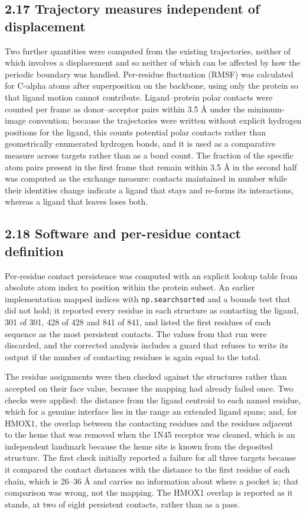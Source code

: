 \documentclass[utf8]{FrontiersinVancouver}
\begin{document}
\subsection{2.17 Trajectory measures independent of displacement}

Two further quantities were computed from the existing trajectories, neither of which involves a displacement and so neither of which can be affected by how the periodic boundary was handled. Per-residue fluctuation (RMSF) was calculated for C-alpha atoms after superposition on the backbone, using only the protein so that ligand motion cannot contribute. Ligand--protein polar contacts were counted per frame as donor--acceptor pairs within 3.5 \AA{} under the minimum-image convention; because the trajectories were written without explicit hydrogen positions for the ligand, this counts potential polar contacts rather than geometrically enumerated hydrogen bonds, and it is used as a comparative measure across targets rather than as a bond count. The fraction of the specific atom pairs present in the first frame that remain within 3.5 \AA{} in the second half was computed as the exchange measure: contacts maintained in number while their identities change indicate a ligand that stays and re-forms its interactions, whereas a ligand that leaves loses both.

\subsection{2.18 Software and per-residue contact definition}

Per-residue contact persistence was computed with an explicit lookup table from absolute atom index to position within the protein subset. An earlier implementation mapped indices with \texttt{np.searchsorted} and a bounds test that did not hold; it reported every residue in each structure as contacting the ligand, 301 of 301, 428 of 428 and 841 of 841, and listed the first residues of each sequence as the most persistent contacts. The values from that run were discarded, and the corrected analysis includes a guard that refuses to write its output if the number of contacting residues is again equal to the total.

The residue assignments were then checked against the structures rather than accepted on their face value, because the mapping had already failed once. Two checks were applied: the distance from the ligand centroid to each named residue, which for a genuine interface lies in the range an extended ligand spans; and, for HMOX1, the overlap between the contacting residues and the residues adjacent to the heme that was removed when the 1N45 receptor was cleaned, which is an independent landmark because the heme site is known from the deposited structure. The first check initially reported a failure for all three targets because it compared the contact distances with the distance to the first residue of each chain, which is 26--36 \AA{} and carries no information about where a pocket is; that comparison was wrong, not the mapping. The HMOX1 overlap is reported as it stands, at two of eight persistent contacts, rather than as a pass.
\end{document}
